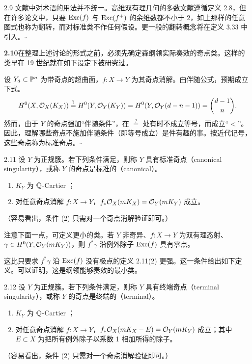 \begin{remark}{2.9}
文献中对术语的用法并不统一。高维双有理几何的多数文献遵循定义 2.8，但在许多论文中，只要 $\operatorname{Exc}(f)$ 与 $\operatorname{Exc}(f^+)$ 的余维数都不小于 2，如上那样的任意图式也称为翻转，而对标准类不作任何假设。更一般的翻转概念将在定义 3.33 中引入。\hfill$\square$
\end{remark}

\par\medskip\noindent\textbf{2.10}\quad 在整理上述讨论的形式之前，必须先确定森纲领实际奏效的奇点类。这样的类早在 19 世纪就在如下设定下被研究过。

设 $Y_d\subset\mathbb{P}^n$ 为带奇点的超曲面，$f\colon X\to Y$ 为其奇点消解。由伴随公式，预期成立下式。
\[
H^0(X,\mathcal{O}_X(K_X))\overset{?}{=}H^0(Y,\mathcal{O}_Y(K_Y))=H^0(Y,\mathcal{O}_Y(d-n-1))=\binom{d-1}{n}.
\]
然而，由于 $Y$ 的奇点强加“伴随条件”，在 $\overset{?}{=}$ 处有时不成立等号，而成立“$<$”。因此，理解哪些奇点不施加伴随条件（即等号成立）是件有趣的事。按近代记号，这些奇点称为标准奇点。\hfill$\square$

\begin{definition}{2.11}
设 $Y$ 为正规簇。若下列条件满足，则称 $Y$ 具有标准奇点（canonical singularity），或称 $Y$ 的奇点是标准的（canonical）。
\begin{enumerate}[label=（\arabic*）,leftmargin=2.6em,itemsep=1pt]
\item $K_Y$ 为 $\mathbb{Q}$-Cartier ；
\item 对任意奇点消解 $f\colon X\to Y$，$f_*\mathcal{O}_X(mK_X)=\mathcal{O}_Y(mK_Y)$ 成立。
\end{enumerate}
（容易看出，条件 (2) 只需对一个奇点消解验证即可。）
\end{definition}

注意下面一点，可定义更小的类。若 $Y$ 非奇异、$f\colon X\to Y$ 为双有理态射、$\gamma\in H^0(Y,\mathcal{O}_Y(mK_Y))$，则 $f^*\gamma$ 沿例外除子 $\operatorname{Exc}(f)$ 具有零点。

这比只要求 $f^*\gamma$ 沿 $\operatorname{Exc}(f)$ 没有极点的定义 2.11(2) 更强。这一条件给出如下定义。可以证明，这是纲领能够奏效的最小类。

\begin{definition}{2.12}
设 $Y$ 为正规簇。若下列条件满足，则称 $Y$ 具有终端奇点（terminal singularity），或称 $Y$ 的奇点是终端的（terminal）。
\begin{enumerate}[label=（\arabic*）,leftmargin=2.6em,itemsep=1pt]
\item $K_Y$ 为 $\mathbb{Q}$-Cartier ；
\item 对任意奇点消解 $f\colon X\to Y$，$f_*\mathcal{O}_X(mK_X-E)=\mathcal{O}_Y(mK_Y)$ 成立；其中 $E\subset X$ 为把所有例外除子以系数 1 相加所得的除子。
\end{enumerate}
（容易看出，条件 (2) 只需对一个奇点消解验证即可。）
\end{definition}

